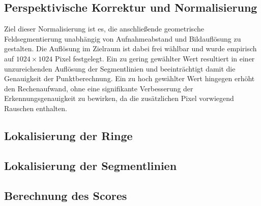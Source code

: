 \subsection{Perspektivische Korrektur und Normalisierung}

Ziel dieser Normalisierung ist es, die anschließende geometrische Feldsegmentierung unabhängig von Aufnahmeabstand und Bildauflösung zu gestalten. Die Auflösung im Zielraum ist dabei frei wählbar und wurde empirisch auf $1024 \times 1024$ Pixel festgelegt. Ein zu gering gewählter Wert resultiert in einer unzureichenden Auflösung der Segmentlinien und beeinträchtigt damit die Genauigkeit der Punktberechnung. Ein zu hoch gewählter Wert hingegen erhöht den Rechenaufwand, ohne eine signifikante Verbesserung der Erkennungsgenauigkeit zu bewirken, da die zusätzlichen Pixel vorwiegend Rauschen enthalten.

\subsection{Lokalisierung der Ringe}

\subsection{Lokalisierung der Segmentlinien}

\subsection{Berechnung des Scores}


